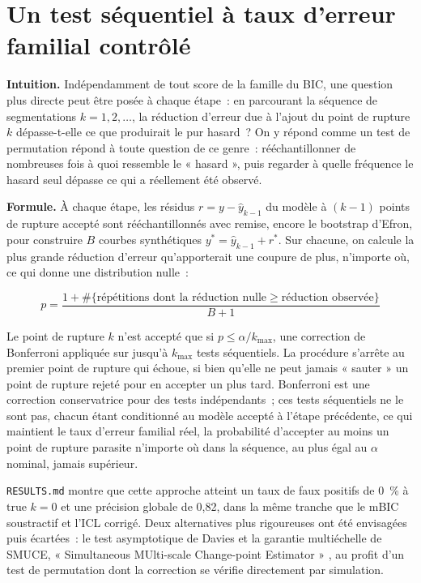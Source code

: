 \documentclass[11pt]{article}
\newcommand{\code}[1]{\texttt{#1}}
\begin{document}
\section{Un test séquentiel à taux d'erreur familial contrôlé}

\textbf{Intuition.} Indépendamment de tout score de la famille du BIC, une
question plus directe peut être posée à chaque étape~: en parcourant la
séquence de segmentations $k = 1, 2, \dots$, la réduction d'erreur due à
l'ajout du point de rupture $k$ dépasse-t-elle ce que produirait le pur
hasard~? On y répond comme un test de permutation répond à toute question
de ce genre~: rééchantillonner de nombreuses fois à quoi ressemble le
« hasard », puis regarder à quelle fréquence le hasard seul dépasse ce qui
a réellement été observé.

\textbf{Formule.} À chaque étape, les résidus $r = y - \hat y_{k-1}$ du
modèle à $(k-1)$ points de rupture accepté sont rééchantillonnés avec
remise, encore le bootstrap d'Efron, pour construire $B$ courbes
synthétiques $y^\ast = \hat y_{k-1} + r^\ast$. Sur chacune, on calcule la
plus grande réduction d'erreur qu'apporterait une coupure de plus,
n'importe où, ce qui donne une distribution nulle~:

\begin{equation}
p = \frac{1 + \#\{\text{répétitions dont la réduction nulle} \ge \text{réduction observée}\}}{B + 1}
\end{equation}

Le point de rupture $k$ n'est accepté que si $p \le \alpha / k_{\max}$, une
correction de Bonferroni appliquée sur jusqu'à $k_{\max}$ tests
séquentiels. La procédure s'arrête au premier point de rupture qui échoue,
si bien qu'elle ne peut jamais « sauter » un point de rupture rejeté pour
en accepter un plus tard. Bonferroni est une correction conservatrice pour
des tests indépendants~; ces tests séquentiels ne le sont pas, chacun étant
conditionné au modèle accepté à l'étape précédente, ce qui maintient le
taux d'erreur familial réel, la probabilité d'accepter au moins un point de
rupture parasite n'importe où dans la séquence, au plus égal au $\alpha$
nominal, jamais supérieur.

\code{RESULTS.md} montre que cette approche atteint un taux de faux
positifs de 0~\% à $\text{true } k = 0$ et une précision globale de 0,82,
dans la même tranche que le mBIC soustractif et l'ICL corrigé. Deux
alternatives plus rigoureuses ont été envisagées puis écartées~: le test
asymptotique de Davies \citeyearpar{davies1977} et la garantie multiéchelle
de SMUCE, « Simultaneous MUlti-scale Change-point Estimator »
\citep{frick2014}, au profit d'un test de permutation dont la correction se
vérifie directement par simulation.
\end{document}
